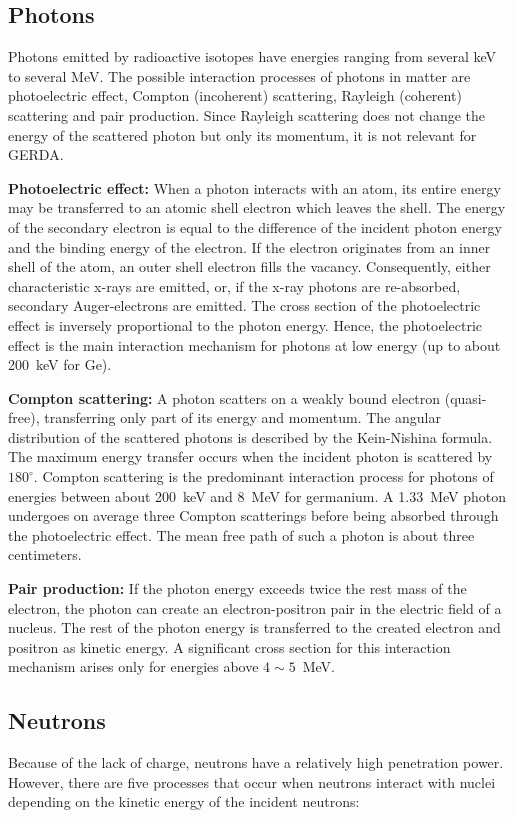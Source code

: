 \subsection{Photons}
\label{sec:det:gamma}
Photons emitted by radioactive isotopes have energies ranging from several keV to several MeV. The possible interaction processes of photons in matter are photoelectric effect, Compton (incoherent) scattering, Rayleigh (coherent) scattering and pair production. Since Rayleigh scattering does not change the energy of the scattered photon but only its momentum, it is not relevant for GERDA.

\textbf{Photoelectric effect:} When a photon interacts with an atom, its entire energy may be transferred to an atomic shell electron which leaves the shell. The energy of the secondary electron is equal to the difference of the incident photon energy and the binding energy of the electron. If the electron originates from an inner shell of the atom, an outer shell electron fills the vacancy. Consequently, either characteristic x-rays are emitted, or, if the x-ray photons are re-absorbed, secondary Auger-electrons are emitted. The cross section of the photoelectric effect is inversely proportional to the photon energy. Hence, the photoelectric effect is the main interaction mechanism for photons at low energy (up to about 200~keV for Ge).

\textbf{Compton scattering:} A photon scatters on a weakly bound electron (quasi-free), transferring only part of its energy and momentum. The angular distribution of the scattered photons is described by the Kein-Nishina formula. The maximum energy transfer occurs when the incident photon is scattered by $180^{\circ}$. Compton scattering is the predominant interaction process for photons of energies between about 200~keV and 8~MeV for germanium. A 1.33~MeV photon undergoes on average three Compton scatterings before being absorbed through the photoelectric effect. The mean free path of such a photon is about three centimeters.

\textbf{Pair production:} If the photon energy exceeds twice the rest mass of the electron, the photon can create an electron-positron pair in the electric field of a nucleus. The rest of the photon energy is transferred to the created electron and positron as kinetic energy. A significant cross section for this interaction mechanism arises only for energies above $4\sim5$~MeV.

\subsection{Neutrons}
\label{sec:det:neutron}
Because of the lack of charge, neutrons have a relatively high penetration power. However, there are five processes that occur when neutrons interact with nuclei depending on the kinetic energy of the incident neutrons:

